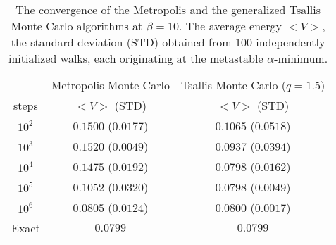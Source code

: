 \newpage
\begin{table}[th]
\caption{The convergence of the Metropolis and the generalized 
Tsallis Monte Carlo algorithms at $\beta=10$. The average energy 
$<V>$, the standard deviation (STD) obtained from 100
independently initialized walks, each originating at the 
metastable $\alpha$-minimum.}

\vspace{4mm}
\begin{tabular}{c|c|c}
\hline
&Metropolis Monte Carlo & Tsallis Monte Carlo ($q=1.5)$ \\ 
steps & $<V>$ (STD) & $<V>$ (STD) \\
\hline
$10^{2}$ & $0.1500$ ($0.0177$) &$0.1065$ ($0.0518$) \\ 
$10^{3}$ & $0.1520$ ($0.0049$) &$0.0937$ ($0.0394$) \\ 
$10^{4}$ & $0.1475$ ($0.0192$) &$0.0798$ ($0.0162$) \\ 
$10^{5}$ & $0.1052$ ($0.0320$) &$0.0798$ ($0.0049$) \\ 
$10^{6}$ & $0.0805$ ($0.0124$) &$0.0800$ ($0.0017$) \\ 
Exact & $0.0799$	 & $0.0799$ \\
\hline
\end{tabular}
\end{table}



